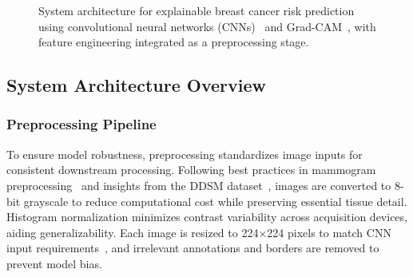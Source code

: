\documentclass[12pt]{article}
\begin{document}
\begin{figure}[H]
    \centering
    \caption{System architecture for explainable breast cancer risk prediction using convolutional neural networks (CNNs)~\cite{1} and Grad-CAM~\cite{5}, with feature engineering integrated as a preprocessing stage.}
    \label{fig:system_architecture}
\end{figure}

\subsection{System Architecture Overview}

\subsubsection{Preprocessing Pipeline}
\label{sec:pipeline}
To ensure model robustness, preprocessing standardizes image inputs for consistent downstream processing. Following best practices in mammogram preprocessing~\cite{7,14} and insights from the DDSM dataset~\cite{18}, images are converted to 8-bit grayscale to reduce computational cost while preserving essential tissue detail. Histogram normalization minimizes contrast variability across acquisition devices, aiding generalizability. Each image is resized to 224×224 pixels to match CNN input requirements~\cite{1}, and irrelevant annotations and borders are removed to prevent model bias.
\end{document}
